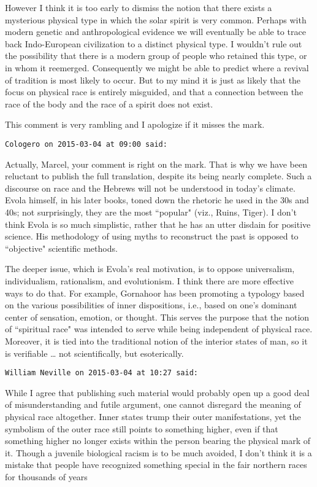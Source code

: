 \begin{footnotesize}
\begin{sffamily}
However I think it is too early to dismiss the notion that there exists a mysterious physical type in which the solar spirit is very common. Perhaps with modern genetic and anthropological evidence we will eventually be able to trace back Indo-European civilization to a distinct physical type. I wouldn't rule out the possibility that there is a modern group of people who retained this type, or in whom it reemerged. Consequently we might be able to predict where a revival of tradition is most likely to occur. But to my mind it is just as likely that the focus on physical race is entirely misguided, and that a connection between the race of the body and the race of a spirit does not exist.

This comment is very rambling and I apologize if it misses the mark.


\hfill

\texttt{Cologero on 2015-03-04 at 09:00 said: }

Actually, Marcel, your comment is right on the mark. That is why we have been reluctant to publish the full translation, despite its being nearly complete. Such a discourse on race and the Hebrews will not be understood in today's climate. Evola himself, in his later books, toned down the rhetoric he used in the 30s and 40s; not surprisingly, they are the most ``popular" (viz., Ruins, Tiger). I don't think Evola is so much simplistic, rather that he has an utter disdain for positive science. His methodology of using myths to reconstruct the past is opposed to ``objective" scientific methods.

The deeper issue, which is Evola's real motivation, is to oppose universalism, individualism, rationalism, and evolutionism. I think there are more effective ways to do that. For example, Gornahoor has been promoting a typology based on the various possibilities of inner dispositions, i.e., based on one's dominant center of sensation, emotion, or thought. This serves the purpose that the notion of ``spiritual race" was intended to serve while being independent of physical race. Moreover, it is tied into the traditional notion of the interior states of man, so it is verifiable … not scientifically, but esoterically.


\hfill

\texttt{William Neville on 2015-03-04 at 10:27 said: }

While I agree that publishing such material would probably open up a good deal of misunderstanding and futile argument, one cannot disregard the meaning of physical race altogether. Inner states trump their outer manifestations, yet the symbolism of the outer race still points to something higher, even if that something higher no longer exists within the person bearing the physical mark of it. Though a juvenile biological racism is to be much avoided, I don't think it is a mistake that people have recognized something special in the fair northern races for thousands of years


\end{sffamily}
\end{footnotesize}

